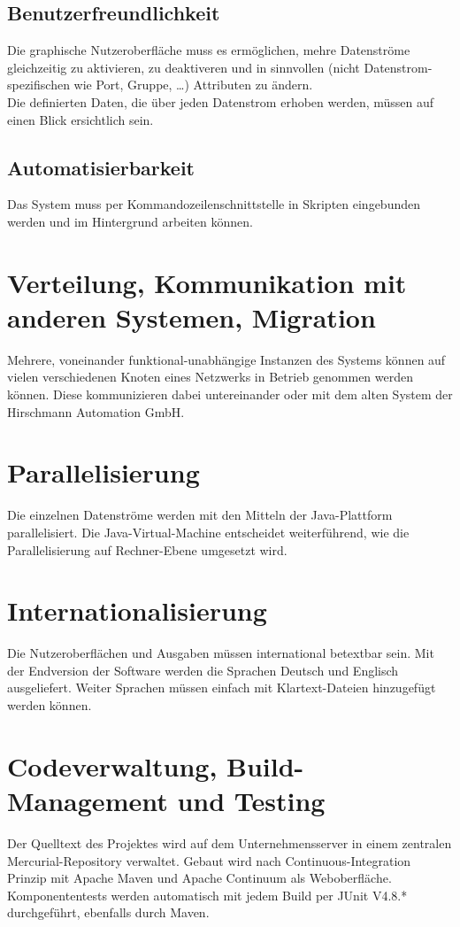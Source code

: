 \subsection{Benutzerfreundlichkeit}
Die graphische Nutzeroberfläche muss es ermöglichen, mehre Datenströme
gleichzeitig zu aktivieren, zu deaktiveren und in sinnvollen (nicht
Datenstrom-spezifischen wie Port, Gruppe, \ldots) Attributen zu ändern.\\
Die definierten Daten, die über jeden Datenstrom erhoben werden, müssen auf
einen Blick ersichtlich sein.

\subsection{Automatisierbarkeit}
Das System muss per Kommandozeilenschnittstelle in Skripten eingebunden werden
und im Hintergrund arbeiten können.

\section{Verteilung, Kommunikation mit anderen Systemen, Migration}
\label{sec:6:komm}
Mehrere, voneinander funktional-unabhängige Instanzen des Systems können auf
vielen verschiedenen Knoten eines Netzwerks in Betrieb genommen werden können. Diese
kommunizieren dabei untereinander oder mit dem alten
System der Hirschmann Automation GmbH.

\section{Parallelisierung}
\label{sec:6:para}
Die einzelnen Datenströme werden mit den Mitteln der Java-Plattform
parallelisiert. Die Java-Virtual-Machine entscheidet weiterführend, wie die
Parallelisierung auf Rechner-Ebene umgesetzt wird.

\section{Internationalisierung}
\label{sec:6:inter}
Die Nutzeroberflächen und Ausgaben müssen international betextbar sein. Mit der
Endversion der Software werden die Sprachen Deutsch und Englisch ausgeliefert.
Weiter Sprachen müssen einfach mit Klartext-Dateien hinzugefügt werden können.

\section{Codeverwaltung, Build-Management und Testing}
\label{sec:6:bm}
Der Quelltext des Projektes wird auf dem Unternehmensserver in einem zentralen
Mercurial-Repository verwaltet. Gebaut wird nach Continuous-Integration Prinzip
mit Apache Maven und Apache Continuum als Weboberfläche. Komponententests
werden automatisch mit jedem Build per JUnit V4.8.* durchgeführt, ebenfalls
durch Maven.
